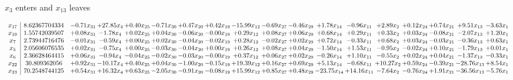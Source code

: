 \documentclass[9pt]{article}
\begin{document}
 $ x_{3} $ enters and $ x_{13} $ leaves 

 \[\begin{array}{c| c c@{\hskip 2pt} c@{\hskip 2pt} c@{\hskip 2pt} c@{\hskip 2pt} c@{\hskip 2pt} c@{\hskip 2pt} c@{\hskip 2pt} c@{\hskip 2pt} c@{\hskip 2pt} c@{\hskip 2pt} c@{\hskip 2pt} c@{\hskip 2pt} c@{\hskip 2pt} c@{\hskip 2pt} c@{\hskip 2pt} c@{\hskip 2pt} }
 x_{17}   &  8.62367704334 & -0.71 x_{31} & + 27.85 x_{4} & +  0.40 x_{25} & -0.71 x_{30} & +  0.47 x_{20} & +  0.42 x_{19} & -15.99 x_{12} & -0.69 x_{27} & -0.46 x_{29} & +  1.78 x_{14} & -0.96 x_{11} & +  2.89 x_{2} & +  0.12 x_{24} & +  0.74 x_{21} & +  9.51 x_{13} & -3.63 x_{1}\\
 x_{10}   &  1.55742039507 & +  0.08 x_{31} & -1.78 x_{4} & +  0.02 x_{25} & +  0.04 x_{30} & -0.06 x_{20} & -0.00 x_{19} & +  0.29 x_{12} & +  0.08 x_{27} & +  0.06 x_{29} & +  0.68 x_{14} & +  0.29 x_{11} & +  0.33 x_{2} & +  0.03 x_{24} & -0.08 x_{21} & -2.07 x_{13} & +  1.20 x_{1}\\
 x_{7}   &  2.73944716476 & -0.01 x_{31} & -0.59 x_{4} & +  0.00 x_{25} & +  0.02 x_{30} & -0.04 x_{20} & -0.02 x_{19} & +  0.28 x_{12} & -0.02 x_{27} & +  0.02 x_{29} & +  0.72 x_{14} & -0.33 x_{11} & +  0.68 x_{2} & +  0.03 x_{24} & -0.03 x_{21} & -0.36 x_{13} & +  0.63 x_{1}\\
 x_{5}   &  2.05606076535 & +  0.02 x_{31} & -0.75 x_{4} & +  0.00 x_{25} & -0.03 x_{30} & -0.04 x_{20} & +  0.00 x_{19} & +  0.26 x_{12} & +  0.08 x_{27} & +  0.04 x_{29} & -1.50 x_{14} & +  1.53 x_{11} & -0.95 x_{2} & -0.02 x_{24} & +  0.10 x_{21} & -1.79 x_{13} & +  0.01 x_{1}\\
 x_{6}   &  2.36628464415 & +  0.06 x_{31} & -0.94 x_{4} & -0.04 x_{25} & -0.02 x_{30} & -0.03 x_{20} & -0.00 x_{19} & +  0.37 x_{12} & +  0.06 x_{27} & +  0.02 x_{29} & -0.26 x_{14} & +  1.10 x_{11} & -0.55 x_{2} & +  0.02 x_{24} & +  0.04 x_{21} & -1.37 x_{13} & -0.33 x_{1}\\
 x_{22}   &  30.809362056 & +  0.92 x_{31} & -10.17 x_{4} & +  0.40 x_{25} & +  0.04 x_{30} & -1.00 x_{20} & -0.15 x_{19} & + 19.39 x_{12} & +  0.16 x_{27} & +  0.69 x_{29} & +  5.13 x_{14} & -0.68 x_{11} & + 10.27 x_{2} & +  0.59 x_{24} & -0.39 x_{21} & -28.76 x_{13} & +  8.54 x_{1}\\
 x_{23}   &  70.2548744125 & +  0.54 x_{31} & + 16.32 x_{4} & +  0.63 x_{25} & -2.05 x_{30} & -0.91 x_{20} & -0.08 x_{19} & + 15.99 x_{12} & +  0.85 x_{27} & +  0.48 x_{29} & -23.75 x_{14} & + 14.16 x_{11} & -7.64 x_{2} & -0.76 x_{24} & +  1.91 x_{21} & -36.56 x_{13} & -5.76 x_{1}\\

\end{array}\]
\end{document}
